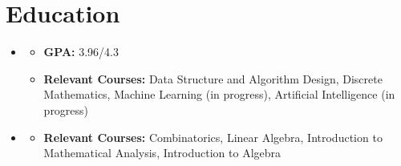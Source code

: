 \section{Education}
\begin{itemize}
    \item {}
    \begin{itemize}
        \item \textbf{GPA:} 3.96/4.3
        \item \textbf{Relevant Courses:} Data Structure and Algorithm Design, Discrete Mathematics,  Machine Learning (in progress), Artificial Intelligence (in progress)
    \end{itemize}

    \item {}
    \begin{itemize}
        \item \textbf{Relevant Courses:} Combinatorics, Linear Algebra, Introduction to Mathematical Analysis, Introduction to Algebra
    \end{itemize}
\end{itemize}

